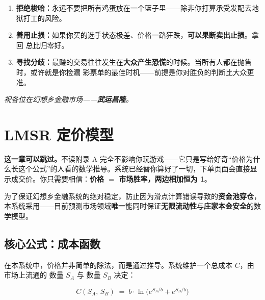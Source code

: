 \documentclass[11pt,a4paper,twoside]{article}
\begin{document}
\begin{enumerate}
  \item \textbf{拒绝梭哈：}永远不要把所有鸡蛋放在一个篮子里——除非你打算承受发配去地狱打工的风险。
  \item \textbf{善用止损：}如果你买的选手状态极差、价格一路狂跌，\textbf{可以果断卖出止损}。拿回  总比归零好。
  \item \textbf{寻找分歧：}最赚的交易往往发生在\textbf{大众产生恐慌}的时候。当所有人都在抛售时，或许就是你捡漏  彩票单的最佳时机——前提是你对胜负的判断比大众更准。
\end{enumerate}

\begin{flushright}\kai\textit{祝各位在幻想乡金融市场——\textbf{武运昌隆}。}\end{flushright}

\clearpage

\appendix
\renewcommand{\thesection}{附录 \Alph{section}}
\setcounter{section}{0}

\section{LMSR 定价模型}

\begin{notebox}
\textbf{这一章可以跳过。}\;不读附录 A 完全不影响你玩游戏——它只是写给好奇“价格为什么长这个公式”的人看的数学推导。系统已经替你算好了一切，下单页面会直接显示成交价。你只需要相信：\textbf{价格 $=$ 市场胜率，两边相加恒为 1}。
\end{notebox}

为了保证幻想乡金融系统的绝对稳定，防止因为滑点计算错误导致的\textbf{资金池穿仓}，本系统采用——目前预测市场领域\textbf{唯一}能同时保证\textbf{无限流动性}与\textbf{庄家本金安全}的数学模型。

\subsection{核心公式：成本函数}

在本系统中，价格并非简单的除法，而是通过推导。系统维护一个总成本 $C$，由市场上流通的 \Acard 数量 $S_A$ 与 \Bcard 数量 $S_B$ 决定：

\begin{mathbox}
\[
  C(S_A,\,S_B) \;=\; b \cdot \ln\!\bigl(e^{S_A/b} + e^{S_B/b}\bigr)
\]
\end{mathbox}
\end{document}
